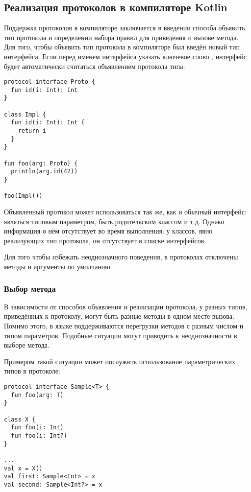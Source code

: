 \subsection{Реализация протоколов в компиляторе Kotlin}

Поддержка протоколов в компиляторе заключается в введении способа объявить тип протокола и определении набора правил для приведения и вызове метода. Для того, чтобы объявить тип протокола в компиляторе был введён новый тип интерфейса. Если перед именем интерфейса указать ключевое слово , интерфейс будет автоматически считаться объявлением протокола типа:

\begin{verbatim}
protocol interface Proto {
  fun id(i: Int): Int
}

class Impl {
  fun id(i: Int): Int {
    return i
  }
}

fun foo(arg: Proto) {
  println(arg.id(42))
}

foo(Impl())
\end{verbatim}

Объявленный протокол может использоваться так же, как и обычный интерфейс: являться типовым параметром, быть родительским классом и т.д. Однако информация о нём отсутствует во время выполнения: у классов, явно реализующих тип протокола, он отсутствует в списке интерфейсов.

Для того чтобы избежать неоднозначного поведения, в протоколах отключены методы и аргументы по умолчанию.

\subsubsection{Выбор метода}

В зависимости от способов объявления и реализации протокола, у разных типов, приведённых к протоколу, могут быть разные методы в одном месте вызова. Помимо этого, в языке  поддерживаются перегрузки методов с разным числом и типом параметров. Подобные ситуации могут приводить к неоднозначности в выборе метода.

Примером такой ситуации может послужить использование параметрических типов в протоколе:
\begin{verbatim}
protocol interface Sample<T> {
  fun foo(arg: T)
}

class X {
  fun foo(i: Int)
  fun foo(i: Int?)
}

...
val x = X()
val first: Sample<Int> = x
val second: Sample<Int?> = x

\end{verbatim}

